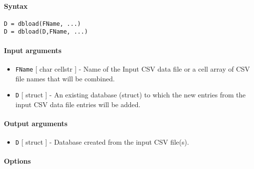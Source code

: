 


	\paragraph{Syntax}

\begin{verbatim}
D = dbload(FName, ...)
D = dbload(D,FName, ...)
\end{verbatim}

\paragraph{Input arguments}

\begin{itemize}
\item
  \texttt{FName} {[} char \textbar{} cellstr {]} - Name of the Input CSV
  data file or a cell array of CSV file names that will be combined.
\item
  \texttt{D} {[} struct {]} - An existing database (struct) to which the
  new entries from the input CSV data file entries will be added.
\end{itemize}

\paragraph{Output arguments}

\begin{itemize}
\itemsep1pt\parskip0pt
\item
  \texttt{D} {[} struct {]} - Database created from the input CSV
  file(s).
\end{itemize}

\paragraph{Options}

